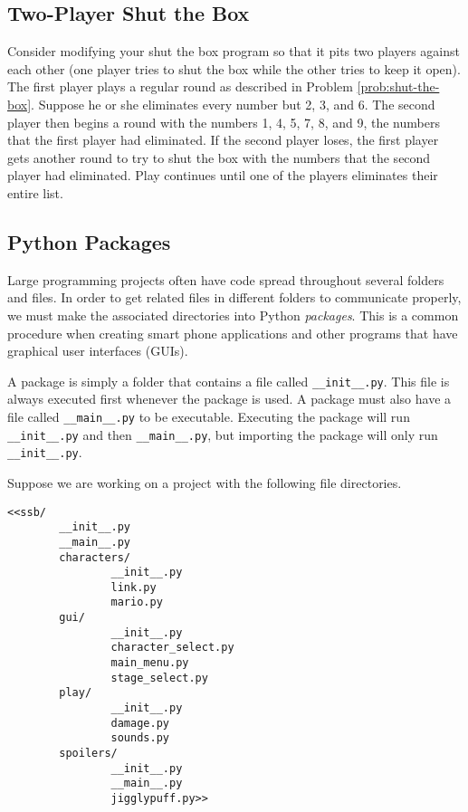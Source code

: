 \subsection*{Two-Player Shut the Box} %

Consider modifying your shut the box program so that it pits two players against each other (one player tries to shut the box while the other tries to keep it open).
The first player plays a regular round as described in Problem \ref{prob:shut-the-box}.
Suppose he or she eliminates every number but 2, 3, and 6.
The second player then begins a round with the numbers 1, 4, 5, 7, 8, and 9, the numbers that the first player had eliminated.
If the second player loses, the first player gets another round to try to shut the box with the numbers that the second player had eliminated.
Play continues until one of the players eliminates their entire list.

\subsection*{Python Packages} %

Large programming projects often have code spread throughout several folders and files.
In order to get related files in different folders to communicate properly, we must make the associated directories into Python \emph{packages}.
This is a common procedure when creating smart phone applications and other programs that have graphical user interfaces (GUIs).

A package is simply a folder that contains a file called \texttt{\_\_init\_\_.py}.
This file is always executed first whenever the package is used.
A package must also have a file called \texttt{\_\_main\_\_.py} to be executable.
Executing the package will run \texttt{\_\_init\_\_.py} and then \texttt{\_\_main\_\_.py}, but importing the package will only run \texttt{\_\_init\_\_.py}.

Suppose we are working on a project with the following file directories.

\begin{lstlisting}
<<ssb/
        __init__.py
        __main__.py
        characters/
                __init__.py
                link.py
                mario.py
        gui/
                __init__.py
                character_select.py
                main_menu.py
                stage_select.py
        play/
                __init__.py
                damage.py
                sounds.py
        spoilers/
                __init__.py
                __main__.py
                jigglypuff.py>>
\end{lstlisting}

